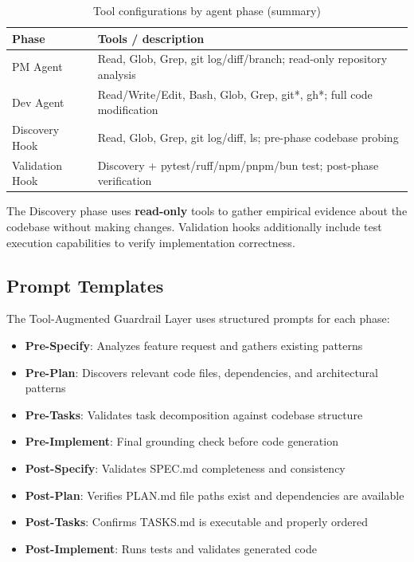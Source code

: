 \documentclass[sigconf,anonymous,review]{acmart}
\begin{document}
\begin{table}[ht]
  \centering
  \caption{Tool configurations by agent phase (summary)}
  \label{tab:tools}
  \scriptsize
  \setlength{\tabcolsep}{3pt}
  \renewcommand{\arraystretch}{1.05}
  \begin{tabular}{@{}l p{5.2cm}@{}}
    \hline
    \textbf{Phase} & \textbf{Tools / description} \\
    \hline
    PM Agent & Read, Glob, Grep, git log/diff/branch; read-only repository analysis \\
    Dev Agent & Read/Write/Edit, Bash, Glob, Grep, git*, gh*; full code modification \\
    Discovery Hook & Read, Glob, Grep, git log/diff, ls; pre-phase codebase probing \\
    Validation Hook & Discovery + pytest/ruff/npm/pnpm/bun test; post-phase verification \\
    \hline
  \end{tabular}
\end{table}

The Discovery phase uses \textbf{read-only} tools to gather empirical evidence about the codebase without making changes. Validation hooks additionally include test execution capabilities to verify implementation correctness.

\subsection{Prompt Templates}

The Tool-Augmented Guardrail Layer uses structured prompts for each phase:

\begin{itemize}
  \item \textbf{Pre-Specify}: Analyzes feature request and gathers existing patterns
  \item \textbf{Pre-Plan}: Discovers relevant code files, dependencies, and architectural patterns
  \item \textbf{Pre-Tasks}: Validates task decomposition against codebase structure
  \item \textbf{Pre-Implement}: Final grounding check before code generation
  \item \textbf{Post-Specify}: Validates SPEC.md completeness and consistency
  \item \textbf{Post-Plan}: Verifies PLAN.md file paths exist and dependencies are available
  \item \textbf{Post-Tasks}: Confirms TASKS.md is executable and properly ordered
  \item \textbf{Post-Implement}: Runs tests and validates generated code
\end{itemize}
\end{document}
